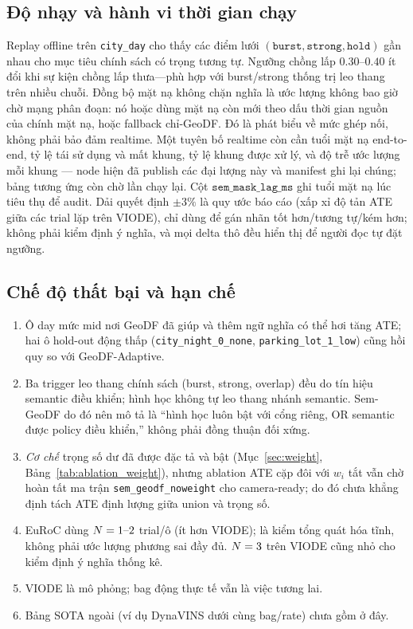 \documentclass{ieeeaccess}
\begin{document}
\subsection{Độ nhạy và hành vi thời gian chạy}
Replay offline trên \texttt{city\_day} cho thấy các điểm lưới \((\texttt{burst},\texttt{strong},\texttt{hold})\) gần nhau cho mục tiêu chính sách có trọng tương tự.
Ngưỡng chồng lấp \(0.30\)--\(0.40\) ít đổi khi sự kiện chồng lấp thưa---phù hợp với burst/strong thống trị leo thang trên nhiều chuỗi.
Đồng bộ mặt nạ không chặn nghĩa là ước lượng không bao giờ chờ mạng phân đoạn: nó hoặc dùng mặt nạ còn mới theo dấu thời gian nguồn của chính mặt nạ, hoặc fallback chỉ-GeoDF. Đó là phát biểu về mức ghép nối, không phải bảo đảm realtime. Một tuyên bố realtime còn cần tuổi mặt nạ end-to-end, tỷ lệ tái sử dụng và mất khung, tỷ lệ khung được xử lý, và độ trễ ước lượng mỗi khung --- node hiện đã publish các đại lượng này và manifest ghi lại chúng; bảng tương ứng còn chờ lần chạy lại.
Cột \(\texttt{sem\_mask\_lag\_ms}\) ghi tuổi mặt nạ lúc tiêu thụ để audit.
Dải quyết định \(\pm3\%\) là quy ước báo cáo (xấp xỉ độ tản ATE giữa các trial lặp trên VIODE), chỉ dùng để gán nhãn tốt hơn/tương tự/kém hơn; không phải kiểm định ý nghĩa, và mọi delta thô đều hiển thị để người đọc tự đặt ngưỡng.

\subsection{Chế độ thất bại và hạn chế}
\begin{enumerate}
\item Ô day mức mid nơi GeoDF đã giúp và thêm ngữ nghĩa có thể hơi tăng ATE; hai ô hold-out động thấp (\texttt{city\_night\_0\_none}, \texttt{parking\_lot\_1\_low}) cũng hồi quy so với GeoDF-Adaptive.
\item Ba trigger leo thang chính sách (burst, strong, overlap) đều do tín hiệu semantic điều khiển; hình học không tự leo thang nhánh semantic. Sem-GeoDF do đó nên mô tả là ``hình học luôn bật với cổng riêng, OR semantic được policy điều khiển,'' không phải đồng thuận đối xứng.
\item \emph{Cơ chế} trọng số dư đã được đặc tả và bật (Mục~\ref{sec:weight}, Bảng~\ref{tab:ablation_weight}), nhưng ablation ATE cặp đôi với \(w_i\) tắt vẫn chờ hoàn tất ma trận \texttt{sem\_geodf\_noweight} cho camera-ready; do đó chưa khẳng định tách ATE định lượng giữa union và trọng số.
\item EuRoC dùng \(N=\mbox{1--2}\) trial/ô (ít hơn VIODE); là kiểm tổng quát hóa tĩnh, không phải ước lượng phương sai đầy đủ. \(N=3\) trên VIODE cũng nhỏ cho kiểm định ý nghĩa thống kê.
\item VIODE là mô phỏng; bag động thực tế vẫn là việc tương lai.
\item Bảng SOTA ngoài (ví dụ DynaVINS dưới cùng bag/rate) chưa gồm ở đây.
\end{enumerate}
\end{document}
